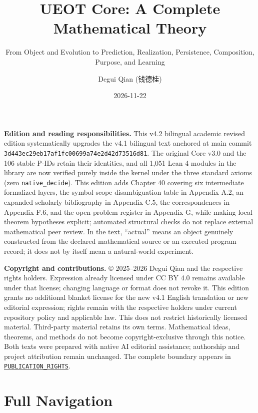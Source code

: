 \documentclass[
  english,
  11pt,
  oneside]{book}
\title{UEOT Core: A Complete Mathematical Theory}
\subtitle{From Object and Evolution to Prediction, Realization, Persistence, Composition, Purpose, and Learning}
\author{Degui Qian (钱德桂)}
\date{2026-11-22}
\begin{document}
\frontmatter
\maketitle

{
\hypersetup{linkcolor=MidnightBlue}
\setcounter{tocdepth}{1}
\tableofcontents
}
\mainmatter
\textbf{Edition and reading responsibilities.} This v4.2 bilingual academic revised edition systematically upgrades the v4.1 bilingual text anchored at main commit \nolinkurl{3d443ec29eb17af1fc00699a74e2d42d73516d81}. The original Core v3.0 and the 106 stable P-IDs retain their identities, and all 1,051 Lean 4 modules in the library are now verified purely inside the kernel under the three standard axioms (zero \nolinkurl{native_decide}). This edition adds Chapter 40 covering six intermediate formalized layers, the symbol-scope disambiguation table in Appendix A.2, an expanded scholarly bibliography in Appendix C.5, the correspondences in Appendix F.6, and the open-problem register in Appendix G, while making local theorem hypotheses explicit; automated structural checks do not replace external mathematical peer review. In the text, ``actual'' means an object genuinely constructed from the declared mathematical source or an executed program record; it does not by itself mean a natural-world experiment.

\textbf{Copyright and contributions.} © 2025--2026 Degui Qian and the respective rights holders. Expression already licensed under CC BY 4.0 remains available under that license; changing language or format does not revoke it. This edition grants no additional blanket license for the new v4.1 English translation or new editorial expression; rights remain with the respective holders under current repository policy and applicable law. This does not restrict historically licensed material. Third-party material retains its own terms. Mathematical ideas, theorems, and methods do not become copyright-exclusive through this notice. Both texts were prepared with native AI editorial assistance; authorship and project attribution remain unchanged. The complete boundary appears in \href{PUBLICATION_RIGHTS.md}{\nolinkurl{PUBLICATION_RIGHTS}}.

\section{Full Navigation}\label{full-navigation}
\end{document}
